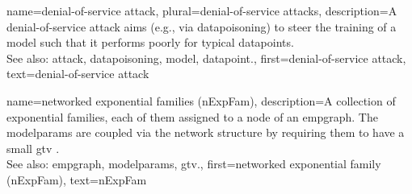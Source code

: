 {name={denial-of-service attack}, plural={denial-of-service attacks},
	description={A 
		denial-of-service \gls{attack} aims (e.g., via \gls{datapoisoning}) to steer the training of a \gls{model} 
		such that it performs poorly for typical \glspl{datapoint}.
				\\
		See also: \gls{attack}, \gls{datapoisoning}, \gls{model}, \gls{datapoint}.},
	first={denial-of-service attack},
	text={denial-of-service attack} 
}

{name={networked exponential families (nExpFam)}, 
	description={A collection of exponential 
		families, each of them assigned to a node of an \gls{empgraph}. The \gls{modelparams} are coupled 
	   	via the network structure by requiring them to have a small \gls{gtv} \cite{JungNetExp2020}.
	   		\\
		See also: \gls{empgraph}, \gls{modelparams}, \gls{gtv}.},
	first={networked exponential family (nExpFam)},
	text={nExpFam} 
}
	 

